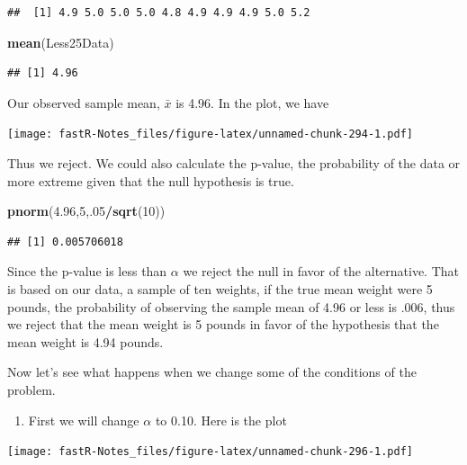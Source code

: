 \documentclass[]{book}
\newenvironment{Shaded}{\begin{snugshade}}{\end{snugshade}}
\newcommand{\KeywordTok}[1]{\textcolor[rgb]{0.13,0.29,0.53}{\textbf{#1}}}
\newcommand{\DecValTok}[1]{\textcolor[rgb]{0.00,0.00,0.81}{#1}}
\newcommand{\FloatTok}[1]{\textcolor[rgb]{0.00,0.00,0.81}{#1}}
\newcommand{\OperatorTok}[1]{\textcolor[rgb]{0.81,0.36,0.00}{\textbf{#1}}}
\newcommand{\NormalTok}[1]{#1}
\providecommand{\tightlist}{%
  \setlength{\itemsep}{0pt}\setlength{\parskip}{0pt}}
\theoremstyle{definition}
\theoremstyle{definition}
\theoremstyle{definition}
\theoremstyle{remark}
\begin{document}
\begin{verbatim}
##  [1] 4.9 5.0 5.0 5.0 4.8 4.9 4.9 4.9 5.0 5.2
\end{verbatim}

\begin{Shaded}
\begin{Highlighting}[]
\KeywordTok{mean}\NormalTok{(Less25Data)}
\end{Highlighting}
\end{Shaded}

\begin{verbatim}
## [1] 4.96
\end{verbatim}

Our observed sample mean, \(\bar{x}\) is 4.96. In the plot, we have

\texttt{[image: fastR-Notes\_files/figure-latex/unnamed-chunk-294-1.pdf]}

Thus we reject. We could also calculate the p-value, the probability of
the data or more extreme given that the null hypothesis is true.

\begin{Shaded}
\begin{Highlighting}[]
\KeywordTok{pnorm}\NormalTok{(}\FloatTok{4.96}\NormalTok{,}\DecValTok{5}\NormalTok{,.}\DecValTok{05}\OperatorTok{/}\KeywordTok{sqrt}\NormalTok{(}\DecValTok{10}\NormalTok{))}
\end{Highlighting}
\end{Shaded}

\begin{verbatim}
## [1] 0.005706018
\end{verbatim}

Since the p-value is less than \(\alpha\) we reject the null in favor of
the alternative. That is based on our data, a sample of ten weights, if
the true mean weight were 5 pounds, the probability of observing the
sample mean of 4.96 or less is .006, thus we reject that the mean weight
is 5 pounds in favor of the hypothesis that the mean weight is 4.94
pounds.

Now let's see what happens when we change some of the conditions of the
problem.

\begin{enumerate}
\def\labelenumi{\arabic{enumi}.}
\tightlist
\item
  First we will change \(\alpha\) to 0.10. Here is the plot
\end{enumerate}

\texttt{[image: fastR-Notes\_files/figure-latex/unnamed-chunk-296-1.pdf]}
\end{document}
